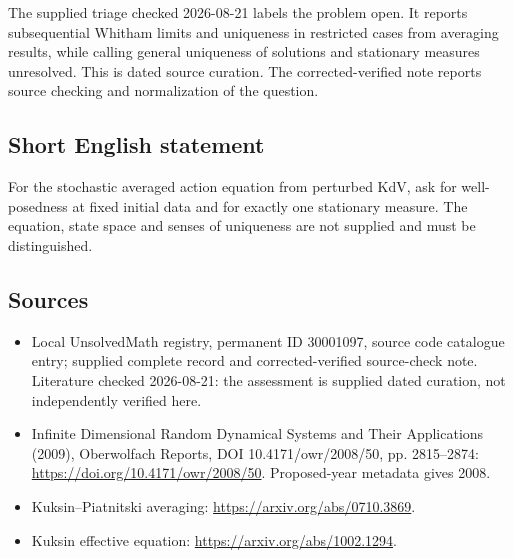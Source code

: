 \documentclass[11pt]{article}
\begin{document}
The supplied triage checked 2026-08-21 labels the problem open. It reports subsequential Whitham limits and uniqueness in restricted cases from averaging results, while calling general uniqueness of solutions and stationary measures unresolved. This is dated source curation. The corrected-verified note reports source checking and normalization of the question.
\subsection{Short English statement}
For the stochastic averaged action equation from perturbed KdV, ask for well-posedness at fixed initial data and for exactly one stationary measure. The equation, state space and senses of uniqueness are not supplied and must be distinguished.
\subsection{Sources}
\begin{itemize}
\item Local UnsolvedMath registry, permanent ID 30001097, source code catalogue entry; supplied complete record and corrected-verified source-check note. Literature checked 2026-08-21: the assessment is supplied dated curation, not independently verified here.
\item Infinite Dimensional Random Dynamical Systems and Their Applications (2009), Oberwolfach Reports, DOI 10.4171/owr/2008/50, pp. 2815--2874: \url{https://doi.org/10.4171/owr/2008/50}. Proposed-year metadata gives 2008.
\item Kuksin--Piatnitski averaging: \url{https://arxiv.org/abs/0710.3869}.
\item Kuksin effective equation: \url{https://arxiv.org/abs/1002.1294}.
\end{itemize}
\end{document}
